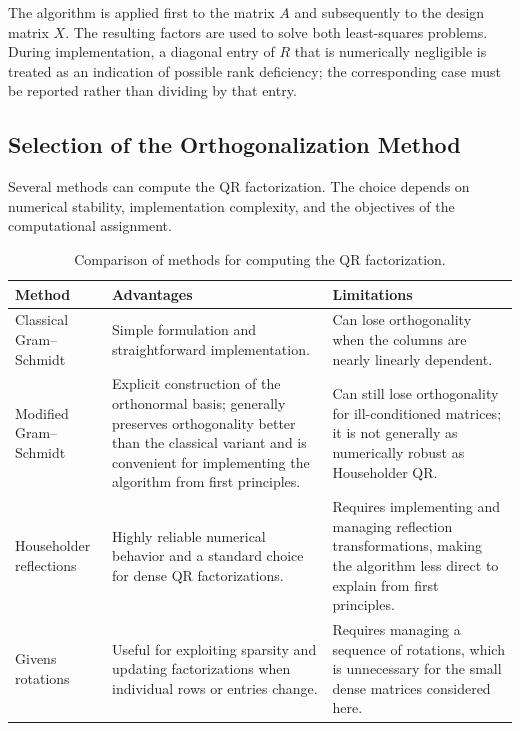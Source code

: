 The algorithm is applied first to the matrix $A$ and subsequently to
the design matrix $X$. The resulting factors are used to solve both
least-squares problems. During implementation, a diagonal entry of
$R$ that is numerically negligible is treated as an indication of
possible rank deficiency; the corresponding case must be reported
rather than dividing by that entry.

\subsection{Selection of the Orthogonalization Method}

Several methods can compute the QR factorization. The choice depends
on numerical stability, implementation complexity, and the objectives
of the computational assignment.

\begin{table}[htbp]
    \centering
    \small
    \caption{Comparison of methods for computing the QR factorization.}
    \label{tab:qr-methods}
    \begin{tabular}{p{2.5cm} p{5.3cm} p{5.3cm}}
        \hline
        \textbf{Method} & \textbf{Advantages} & \textbf{Limitations}       \\
        \hline
        Classical Gram--Schmidt
                        &
        Simple formulation and straightforward implementation.
                        &
        Can lose orthogonality when the columns are nearly linearly
        dependent.                                                         \\[0.3em]

        Modified Gram--Schmidt
                        &
        Explicit construction of the orthonormal basis; generally preserves
        orthogonality better than the classical variant and is convenient
        for implementing the algorithm from first principles.
                        &
        Can still lose orthogonality for ill-conditioned matrices; it is
        not generally as numerically robust as Householder QR.             \\[0.3em]

        Householder reflections
                        &
        Highly reliable numerical behavior and a standard choice for dense
        QR factorizations.
                        &
        Requires implementing and managing reflection transformations,
        making the algorithm less direct to explain from first principles. \\[0.3em]

        Givens rotations
                        &
        Useful for exploiting sparsity and updating factorizations when
        individual rows or entries change.
                        &
        Requires managing a sequence of rotations, which is unnecessary
        for the small dense matrices considered here.                      \\
        \hline
    \end{tabular}
\end{table}

